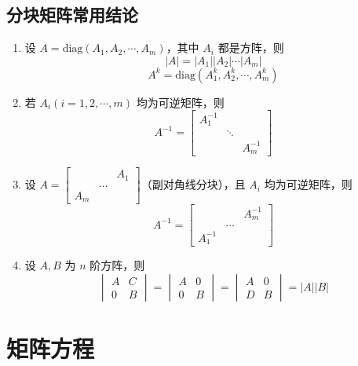 \documentclass[UTF8]{ctexart}
\theoremstyle{mydef}
\begin{document}
\subsection{分块矩阵常用结论}
\begin{enumerate}
    \item 设 $A = \text{diag}(A_1, A_2, \cdots, A_m)$，其中 $A_i$ 都是方阵，则
    $$ |A| = |A_1| |A_2| \cdots |A_m| $$
    $$ A^k = \text{diag}(A_1^k, A_2^k, \cdots, A_m^k) $$
    \item 若 $A_i (i=1, 2, \cdots, m)$ 均为可逆矩阵，则
    $$
    A^{-1} = \begin{bmatrix} A_1^{-1} & & \\ & \ddots & \\ & & A_m^{-1} \end{bmatrix}
    $$
    \item 设 $A = \begin{bmatrix} & & A_1 \\ & \dots & \\ A_m & & \end{bmatrix}$（副对角线分块），且 $A_i$ 均为可逆矩阵，则
    $$
    A^{-1} = \begin{bmatrix} & & A_m^{-1} \\ & \dots & \\ A_1^{-1} & & \end{bmatrix}
    $$
    \item 设 $A, B$ 为 $n$ 阶方阵，则
    $$
    \begin{vmatrix} A & C \\ 0 & B \end{vmatrix} = \begin{vmatrix} A & 0 \\ 0 & B \end{vmatrix} = \begin{vmatrix} A & 0 \\ D & B \end{vmatrix} = |A| |B|
    $$
\end{enumerate}


\section{矩阵方程}
\end{document}
